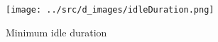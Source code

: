 \begin{figure}[htb]
\centering
\texttt{[image: ../src/d\_images/idleDuration.png]}
\caption{Minimum idle duration}
\label{fig:idleDuration}
\end{figure}

\begin{comment}
Figure~\ref{fig:idleTime} plots the km/l for all trips as a function of how many seconds the vehicle has been idling.
The size of the plot indicates the amount of fuel used in the trip and the color signals what class it has been asigned to.
TODO: analyse
\begin{figure}[htb]
\centering
\texttt{[image: ../src/images/idleTime.png]}
\caption{Idle time}
\label{fig:idleTime}
\end{figure}

It might give a more fair result, if the numbers from Figure~\ref{fig:idleTime} are normalised such that the x-axis plots how many percent of the records are an idle state compared to the number of records in the trip.
Figure~\ref{fig:idlePercent} plots the km/l for all trips as a function of how many percent of the trip the vehicle has been idling.
The size of the plot indicates the amount of fuel used in the trip and the color signals what class it has been asigned to.
TODO: analyse
\begin{figure}[htb]
\centering
\texttt{[image: ../src/images/idlePercent.png]}
\caption{Idle percent}
\label{fig:idlePercent}
\end{figure}

Figure~\ref{fig:idleClassPercent} abstracts away the actual km/l and only plots the class distibution as a function of he idle percent. 
The purple line indicates how many trips have this idle percentage. 
The graph is cut off at 60 \% because of too little data.
It is evident that the majority of the trips in the \fuelHigh class avoids idling. 
TODO: analyse

\begin{figure}[htb]
\centering
\texttt{[image: ../src/images/idle2.png]}
\caption{Class distribution }
\label{fig:idleClassPercent}
\end{figure}

\begin{figure}[htb]
\centering
\texttt{[image: ../src/images/idle3.png]}
\caption{Class distribution}
\label{fig:idleClassTime}
\end{figure}

\end{comment}

